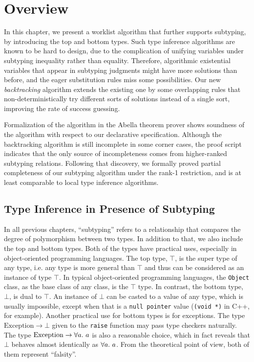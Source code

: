 
\section{Overview}

In this chapter, we present a worklist algorithm
that further supports subtyping,
by introducing the top and bottom types.
Such type inference algorithms are known to be hard to design,
due to the complication of unifying variables under subtyping inequality
rather than equality.
Therefore, algorithmic existential variables that appear in subtyping judgments
might have more solutions than before,
and the eager substitution rules miss some possibilities.
Our new \emph{backtracking} algorithm extends the existing one by some overlapping rules that
non-deterministically try different sorts of solutions instead of a single sort,
improving the rate of success guessing.

Formalization of the algorithm in the Abella theorem prover shows soundness of the algorithm
with respect to our declarative specification.
Although the backtracking algorithm is still incomplete in some corner cases,
the proof script indicates that the only source of incompleteness comes from
higher-ranked subtyping relations.
Following that discovery, we formally proved partial completeness of our subtyping algorithm
under the rank-1 restriction,
and is at least comparable to local type inference algorithms.

\subsection{Type Inference in Presence of Subtyping}

In all previous chapters, ``subtyping'' refers to a relationship that compares
the degree of polymorphism between two types.
In addition to that, we also include the top and bottom types.
Both of the types have practical uses, especially in object-oriented programming languages.
The top type, $\top$, is the super type of any type,
i.e. any type is more general than $\top$
and thus can be considered as an instance of type $\top$.
In typical object-oriented programming languages, the \texttt{Object} class,
as the base class of any class, is the $\top$ type.
In contrast, the bottom type, $\bot$, is dual to $\top$.
An instance of $\bot$ can be casted to a value of any type, which is usually impossible,
except when that is a \texttt{null pointer} value (\texttt{(void *)} in C++, for example).
Another practical use for bottom types is for exceptions.
The type $\text{Exception} \to \bot$ given to the \texttt{raise}
function may pass type checkers naturally.
The type $\text{Exception} \to \all a$ is also a reasonable choice,
which in fact reveals that $\bot$ behaves almost identically as $\all a$.
From the theoretical point of view, both of them represent ``falsity''.

